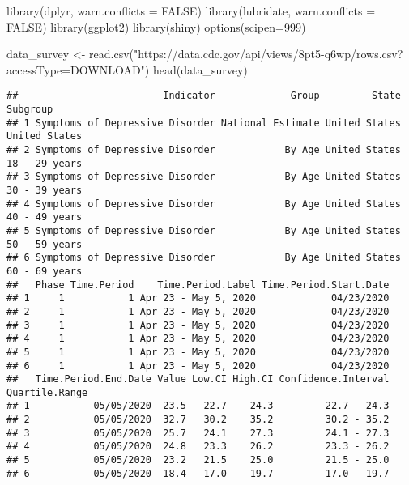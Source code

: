 \documentclass[
]{article}
\newenvironment{Shaded}{\begin{snugshade}}{\end{snugshade}}
\newcommand{\AttributeTok}[1]{\textcolor[rgb]{0.77,0.63,0.00}{#1}}
\newcommand{\ConstantTok}[1]{\textcolor[rgb]{0.00,0.00,0.00}{#1}}
\newcommand{\DecValTok}[1]{\textcolor[rgb]{0.00,0.00,0.81}{#1}}
\newcommand{\FunctionTok}[1]{\textcolor[rgb]{0.00,0.00,0.00}{#1}}
\newcommand{\NormalTok}[1]{#1}
\newcommand{\OtherTok}[1]{\textcolor[rgb]{0.56,0.35,0.01}{#1}}
\newcommand{\StringTok}[1]{\textcolor[rgb]{0.31,0.60,0.02}{#1}}
\begin{document}
\begin{Shaded}
\begin{Highlighting}[]
\FunctionTok{library}\NormalTok{(dplyr, }\AttributeTok{warn.conflicts =} \ConstantTok{FALSE}\NormalTok{)}
\FunctionTok{library}\NormalTok{(lubridate, }\AttributeTok{warn.conflicts =} \ConstantTok{FALSE}\NormalTok{)}
\FunctionTok{library}\NormalTok{(ggplot2)}
\FunctionTok{library}\NormalTok{(shiny)}
\FunctionTok{options}\NormalTok{(}\AttributeTok{scipen=}\DecValTok{999}\NormalTok{) }

\NormalTok{data\_survey }\OtherTok{\textless{}{-}} \FunctionTok{read.csv}\NormalTok{(}\StringTok{"https://data.cdc.gov/api/views/8pt5{-}q6wp/rows.csv?accessType=DOWNLOAD"}\NormalTok{)}
\FunctionTok{head}\NormalTok{(data\_survey)}
\end{Highlighting}
\end{Shaded}

\begin{verbatim}
##                         Indicator             Group         State      Subgroup
## 1 Symptoms of Depressive Disorder National Estimate United States United States
## 2 Symptoms of Depressive Disorder            By Age United States 18 - 29 years
## 3 Symptoms of Depressive Disorder            By Age United States 30 - 39 years
## 4 Symptoms of Depressive Disorder            By Age United States 40 - 49 years
## 5 Symptoms of Depressive Disorder            By Age United States 50 - 59 years
## 6 Symptoms of Depressive Disorder            By Age United States 60 - 69 years
##   Phase Time.Period    Time.Period.Label Time.Period.Start.Date
## 1     1           1 Apr 23 - May 5, 2020             04/23/2020
## 2     1           1 Apr 23 - May 5, 2020             04/23/2020
## 3     1           1 Apr 23 - May 5, 2020             04/23/2020
## 4     1           1 Apr 23 - May 5, 2020             04/23/2020
## 5     1           1 Apr 23 - May 5, 2020             04/23/2020
## 6     1           1 Apr 23 - May 5, 2020             04/23/2020
##   Time.Period.End.Date Value Low.CI High.CI Confidence.Interval Quartile.Range
## 1           05/05/2020  23.5   22.7    24.3         22.7 - 24.3               
## 2           05/05/2020  32.7   30.2    35.2         30.2 - 35.2               
## 3           05/05/2020  25.7   24.1    27.3         24.1 - 27.3               
## 4           05/05/2020  24.8   23.3    26.2         23.3 - 26.2               
## 5           05/05/2020  23.2   21.5    25.0         21.5 - 25.0               
## 6           05/05/2020  18.4   17.0    19.7         17.0 - 19.7
\end{verbatim}
\end{document}

